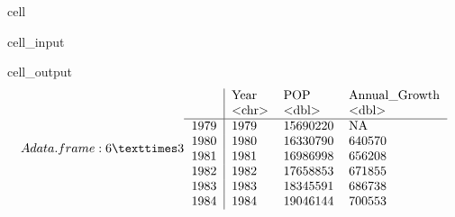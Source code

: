 \documentclass[letterpaper,10pt,english]{jupyterBook}
\begin{document}
\begin{sphinxuseclass}{cell}\begin{sphinxVerbatimInput}

\begin{sphinxuseclass}{cell_input}
\begin{sphinxVerbatim}[commandchars=\\\{\}]
\end{sphinxVerbatim}

\end{sphinxuseclass}\end{sphinxVerbatimInput}
\begin{sphinxVerbatimOutput}

\begin{sphinxuseclass}{cell_output}\begin{equation*}
\begin{split}A data.frame: 6 × 3
\begin{tabular}{r|lll}
  & Year & POP & Annual\_Growth\\
  & <chr> & <dbl> & <dbl>\\
\hline
	1979 & 1979 & 15690220 &     NA\\
	1980 & 1980 & 16330790 & 640570\\
	1981 & 1981 & 16986998 & 656208\\
	1982 & 1982 & 17658853 & 671855\\
	1983 & 1983 & 18345591 & 686738\\
	1984 & 1984 & 19046144 & 700553\\
\end{tabular}\end{split}
\end{equation*}
\end{sphinxuseclass}\end{sphinxVerbatimOutput}

\end{sphinxuseclass}
\end{document}
